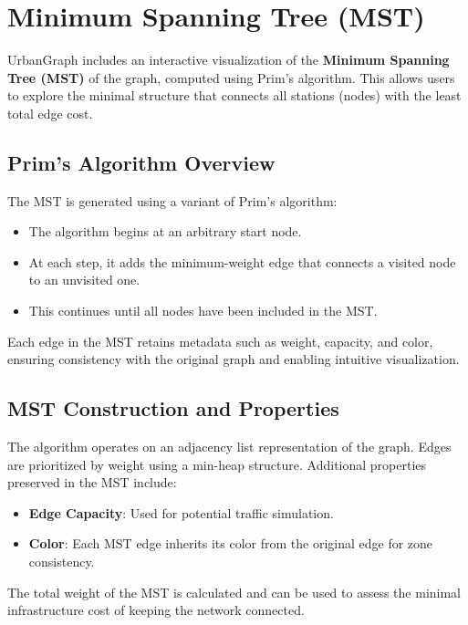 \documentclass[12pt]{article}
\begin{document}
\section{Minimum Spanning Tree (MST)}

UrbanGraph includes an interactive visualization of the \textbf{Minimum Spanning Tree (MST)} of the graph, computed using Prim’s algorithm. This allows users to explore the minimal structure that connects all stations (nodes) with the least total edge cost.

\subsection*{Prim's Algorithm Overview}

The MST is generated using a variant of Prim’s algorithm:
\begin{itemize}
    \item The algorithm begins at an arbitrary start node.
    \item At each step, it adds the minimum-weight edge that connects a visited node to an unvisited one.
    \item This continues until all nodes have been included in the MST.
\end{itemize}

Each edge in the MST retains metadata such as weight, capacity, and color, ensuring consistency with the original graph and enabling intuitive visualization.

\subsection*{MST Construction and Properties}

The algorithm operates on an adjacency list representation of the graph. Edges are prioritized by weight using a min-heap structure. Additional properties preserved in the MST include:
\begin{itemize}
    \item \textbf{Edge Capacity}: Used for potential traffic simulation.
    \item \textbf{Color}: Each MST edge inherits its color from the original edge for zone consistency.
\end{itemize}

The total weight of the MST is calculated and can be used to assess the minimal infrastructure cost of keeping the network connected.
\end{document}
